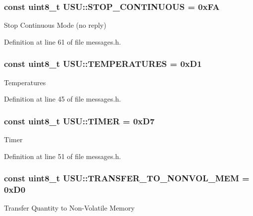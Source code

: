\hypertarget{namespace_u_s_u_ae7447325a101912b787905199c4f2acb}{
\subsubsection[{\-S\-T\-O\-P\-\_\-\-C\-O\-N\-T\-I\-N\-U\-O\-U\-S}]{\setlength{\rightskip}{0pt plus 5cm}const uint8\-\_\-t {\bf \-U\-S\-U\-::\-S\-T\-O\-P\-\_\-\-C\-O\-N\-T\-I\-N\-U\-O\-U\-S} = 0x\-F\-A}}\label{namespace_u_s_u_ae7447325a101912b787905199c4f2acb}
\-Stop \-Continuous \-Mode (no reply) 

\-Definition at line 61 of file messages.\-h.

\hypertarget{namespace_u_s_u_ac5f57d308aea3cdda7c0a2ddade6996b}{
\subsubsection[{\-T\-E\-M\-P\-E\-R\-A\-T\-U\-R\-E\-S}]{\setlength{\rightskip}{0pt plus 5cm}const uint8\-\_\-t {\bf \-U\-S\-U\-::\-T\-E\-M\-P\-E\-R\-A\-T\-U\-R\-E\-S} = 0x\-D1}}\label{namespace_u_s_u_ac5f57d308aea3cdda7c0a2ddade6996b}
\-Temperatures 

\-Definition at line 45 of file messages.\-h.

\hypertarget{namespace_u_s_u_abed08045a54f63e04380a2ac80bcaf79}{
\subsubsection[{\-T\-I\-M\-E\-R}]{\setlength{\rightskip}{0pt plus 5cm}const uint8\-\_\-t {\bf \-U\-S\-U\-::\-T\-I\-M\-E\-R} = 0x\-D7}}\label{namespace_u_s_u_abed08045a54f63e04380a2ac80bcaf79}
\-Timer 

\-Definition at line 51 of file messages.\-h.

\hypertarget{namespace_u_s_u_a440c70222186b93e58fd4448cecb2ad2}{
\subsubsection[{\-T\-R\-A\-N\-S\-F\-E\-R\-\_\-\-T\-O\-\_\-\-N\-O\-N\-V\-O\-L\-\_\-\-M\-E\-M}]{\setlength{\rightskip}{0pt plus 5cm}const uint8\-\_\-t {\bf \-U\-S\-U\-::\-T\-R\-A\-N\-S\-F\-E\-R\-\_\-\-T\-O\-\_\-\-N\-O\-N\-V\-O\-L\-\_\-\-M\-E\-M} = 0x\-D0}}\label{namespace_u_s_u_a440c70222186b93e58fd4448cecb2ad2}
\-Transfer \-Quantity to \-Non-\/\-Volatile \-Memory 

